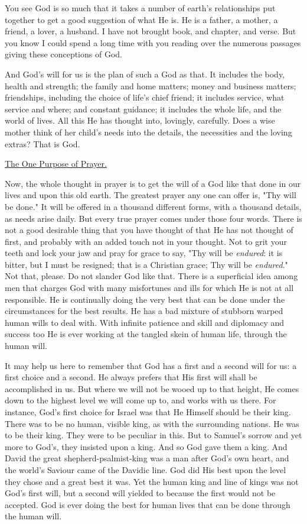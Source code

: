 You see God is so much that it takes a number of earth's relationships put
together to get a good suggestion of what He is. He is a father, a
mother, a friend, a lover, a husband. I have not brought book, and
chapter, and verse. But you know I could spend a long time with you
reading over the numerous passages giving these conceptions of God.

And God's will for us is the plan of such a God as that. It includes the
body, health and strength; the family and home matters; money and business
matters; friendships, including the choice of life's chief friend; it
includes service, what service and where; and constant guidance; it
includes the whole life, and the world of lives. All this He has thought
into, lovingly, carefully. Does a wise mother think of her child's needs
into the details, the necessities and the loving extras? That is God.



\underline{The One Purpose of Prayer.}


Now, the whole thought in prayer is to get the will of a God like that
done in our lives and upon this old earth. The greatest prayer any one can
offer is, "Thy will be done." It will be offered in a thousand different
forms, with a thousand details, as needs arise daily. But every true
prayer comes under those four words. There is not a good desirable thing
that you have thought of that He has not thought of first, and probably
with an added touch not in your thought. Not to grit your teeth and lock
your jaw and pray for grace to say, "Thy will be \textit{endured}: it is bitter,
but I must be resigned; that is a Christian grace; Thy will be
\textit{endured}." Not that, please. Do not slander God like that. There is a
superficial idea among men that charges God with many misfortunes and ills
for which He is not at all responsible. He is continually doing the very
best that can be done under the circumstances for the best results. He has
a bad mixture of stubborn warped human wills to deal with. With infinite
patience and skill and diplomacy and success too He is ever working at the
tangled skein of human life, through the human will.

It may help us here to remember that God has a first and a second will for
us: a first choice and a second. He always prefers that His first will
shall be accomplished in us. But where we will not be wooed up to that
height, He comes down to the highest level we will come up to, and works
with us there. For instance, God's first choice for Israel was that He
Himself should be their king. There was to be no human, visible king, as
with the surrounding nations. He was to be their king. They were to be
peculiar in this. But to Samuel's sorrow and yet more to God's, they
insisted upon a king. And so God gave them a king. And David the great
shepherd-psalmist-king was a man after God's own heart, and the world's
Saviour came of the Davidic line. God did His best upon the level they
chose and a great best it was. Yet the human king and line of kings was
not God's first will, but a second will yielded to because the first
would not be accepted. God is ever doing the best for human lives that can
be done through the human will.

